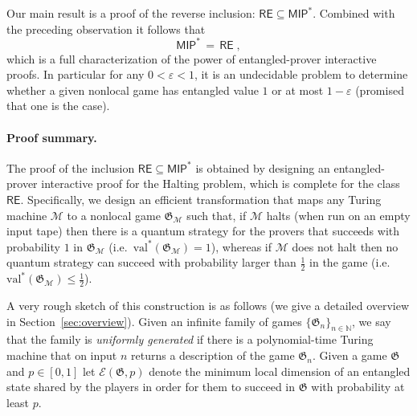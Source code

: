 \documentclass[11pt]{article}
\theoremstyle{definition}
\newcommand{\ket}[1]{|#1\rangle}
\newcommand{\N}{\ensuremath{\mathbb{N}}}
\newcommand{\mH}{\ensuremath{\mathcal{H}}}
\newcommand{\val}{\ensuremath{\mathrm{val}}}
\newcommand{\eps}{\varepsilon}
\newcommand{\game}{\mathfrak{G}}
\newcommand{\labelstyle}[1]{\ensuremath{\textsc{#1}}\xspace}
\newcommand{\alice}{\labelstyle{A}}
\newcommand{\bob}{\labelstyle{B}}
\newcommand{\class}[1]{\ensuremath{\mathsf{#1}}\xspace}
\newcommand{\MIP}{\class{MIP}} %
\newcommand{\RE}{\class{RE}} %
\newcommand{\Ent}{\mathscr{E}}
\renewcommand{\cal}[1]{\mathcal{#1}}
\begin{document}
Our main result is a proof of the reverse inclusion: $\RE \subseteq \MIP^*$. Combined with the preceding observation it follows that 
\[ \MIP^* \,=\, \RE \;,\]
which is a full characterization of the power of entangled-prover interactive proofs. In particular for any $0 < \eps < 1$, it is an undecidable problem to determine whether a given nonlocal game has entangled value $1$ or at most $1 - \eps$ (promised that one is the case).

\paragraph{Proof summary.}
The proof of the inclusion $\RE \subseteq \MIP^*$ is obtained by designing an entangled-prover interactive proof for the Halting problem, which is complete for the class $\RE$. Specifically, we design an efficient transformation that maps any Turing machine $\cal{M}$ to a 
nonlocal game $\game_{\cal{M}}$ such that, if $\cal{M}$ halts (when run on an empty input tape) then there is a quantum strategy for the provers that succeeds with probability $1$ in $\game_{\cal{M}}$ (i.e.\ $\val^*(\game_{\cal{M}})=1$), whereas if $\cal{M}$ does not halt then no quantum strategy can succeed with probability larger than $\frac{1}{2}$ in the game (i.e.\ $\val^*(\game_{\cal{M}})\leq \frac{1}{2}$). %



A very rough sketch of this construction is as follows (we give a detailed overview in Section~\ref{sec:overview}). Given an infinite family of games $\{ \game_n \}_{n \in \N}$, we say that the family is \emph{uniformly generated} if there is a polynomial-time Turing machine that on input $n$ returns a description of the game $\game_n$. Given a game $\game$ and $p\in[0,1]$ let $\Ent(\game,p)$ denote the minimum local dimension of an entangled state shared by the players in order for them to succeed in $\game$ with probability at least $p$. 
\end{document}
